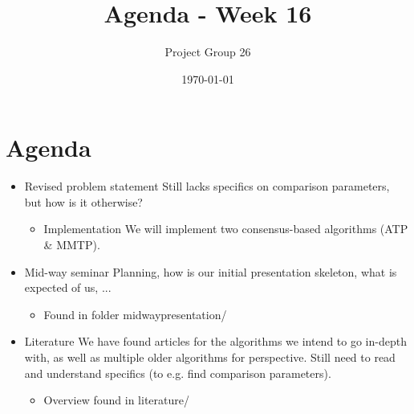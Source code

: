 \documentclass{article}
\title{Agenda - Week 16}
\author{Project Group 26}
\date{\today}
\begin{document}
\maketitle



\section{Agenda}

\begin{itemize}
    \item Revised problem statement
          Still lacks specifics on comparison parameters, but how is it otherwise?
    \begin{itemize}
        \item Implementation
              We will implement two consensus-based algorithms (ATP \& MMTP).
    \end{itemize}
    \item Mid-way seminar
          Planning, how is our initial presentation skeleton, what is expected of us, ...
    \begin{itemize}
        \item Found in folder midwaypresentation/
    \end{itemize}
    \item Literature
          We have found articles for the algorithms we intend to go in-depth with, as well as multiple older algorithms for perspective. Still need to read and understand specifics (to e.g. find comparison parameters).
    \begin{itemize}
        \item Overview found in literature/
    \end{itemize}
\end{itemize}
\end{document}

